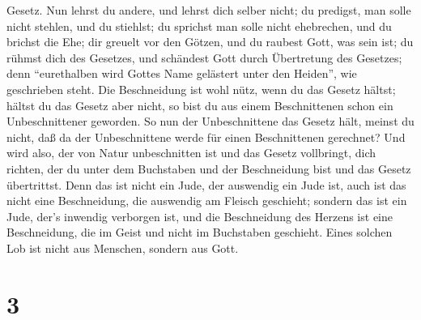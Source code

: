 Gesetz.  Nun lehrst du andere, und lehrst dich selber
nicht; du predigst, man solle nicht stehlen, und du stiehlst;
 du sprichst man solle nicht ehebrechen, und du brichst die
Ehe; dir greuelt vor den Götzen, und du raubest Gott, was sein ist;
 du rühmst dich des Gesetzes, und schändest Gott durch
Übertretung des Gesetzes;  denn ``eurethalben wird Gottes
Name gelästert unter den Heiden'', wie geschrieben steht. 
Die Beschneidung ist wohl nütz, wenn du das Gesetz hältst; hältst du das
Gesetz aber nicht, so bist du aus einem Beschnittenen schon ein
Unbeschnittener geworden.  So nun der Unbeschnittene das
Gesetz hält, meinst du nicht, daß da der Unbeschnittene werde für einen
Beschnittenen gerechnet?  Und wird also, der von Natur
unbeschnitten ist und das Gesetz vollbringt, dich richten, der du unter
dem Buchstaben und der Beschneidung bist und das Gesetz übertrittst.
 Denn das ist nicht ein Jude, der auswendig ein Jude ist,
auch ist das nicht eine Beschneidung, die auswendig am Fleisch
geschieht;  sondern das ist ein Jude, der's inwendig
verborgen ist, und die Beschneidung des Herzens ist eine Beschneidung,
die im Geist und nicht im Buchstaben geschieht. Eines solchen Lob ist
nicht aus Menschen, sondern aus Gott.

\hypertarget{section-2}{%
\section{3}\label{section-2}}

